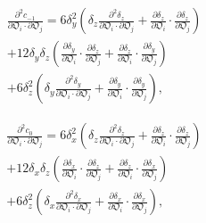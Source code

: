 \documentclass[a4paper,11pt,twoside,openright]{book}
\def\lthtmlcheckvsize{\ifdim\ht\sizebox<\vsize 
  \ifdim\wd\sizebox<\hsize\expandafter\hfill\fi \expandafter\vfill
  \else\expandafter\vss\fi}%
\begin{document}
{\newpage\clearpage
\setcounter{equation}{123}
%
\begin{subequations}\begin{multline}
\frac{\partial^2 c_{-1}}{\partial \mathfrak{O}_i \cdot \partial \mathfrak{O}_j} =
6 \delta_y^2 \left( \delta_z \frac{\partial^2 \delta_z}{\partial \mathfrak{O}_i \cdot \partial \mathfrak{O}_j}
+  \frac{\partial \delta_z}{\partial \mathfrak{O}_i} \cdot \frac{\partial \delta_z}{\partial \mathfrak{O}_j} \right) \\
+  12 \delta_y \delta_z \left( \frac{\partial \delta_y}{\partial \mathfrak{O}_i} \cdot \frac{\partial \delta_z}{\partial \mathfrak{O}_j}
+  \frac{\partial \delta_z}{\partial \mathfrak{O}_i} \cdot \frac{\partial \delta_y}{\partial \mathfrak{O}_j} \right) \\
+  6 \delta_z^2 \left( \delta_y \frac{\partial^2 \delta_y}{\partial \mathfrak{O}_i \cdot \partial \mathfrak{O}_j}
+  \frac{\partial \delta_y}{\partial \mathfrak{O}_i} \cdot \frac{\partial \delta_y}{\partial \mathfrak{O}_j} \right),
\end{multline}\end{subequations}%
\lthtmldisplayZ
\lthtmlcheckvsize\clearpage}

{\newpage\clearpage
\setcounter{equation}{123}
%
\begin{subequations}\begin{multline}
\frac{\partial^2 c_{0}}{\partial \mathfrak{O}_i \cdot \partial \mathfrak{O}_j}  =
6 \delta_x^2 \left( \delta_z \frac{\partial^2 \delta_z}{\partial \mathfrak{O}_i \cdot \partial \mathfrak{O}_j}
+  \frac{\partial \delta_z}{\partial \mathfrak{O}_i} \cdot \frac{\partial \delta_z}{\partial \mathfrak{O}_j} \right) \\
+  12 \delta_x \delta_z \left( \frac{\partial \delta_x}{\partial \mathfrak{O}_i} \cdot \frac{\partial \delta_z}{\partial \mathfrak{O}_j}
+  \frac{\partial \delta_z}{\partial \mathfrak{O}_i} \cdot \frac{\partial \delta_x}{\partial \mathfrak{O}_j} \right) \\
+  6 \delta_z^2 \left( \delta_x \frac{\partial^2 \delta_x}{\partial \mathfrak{O}_i \cdot \partial \mathfrak{O}_j}
+  \frac{\partial \delta_x}{\partial \mathfrak{O}_i} \cdot \frac{\partial \delta_x}{\partial \mathfrak{O}_j} \right),
\end{multline}\end{subequations}%
\lthtmldisplayZ
\lthtmlcheckvsize\clearpage}
\end{document}
